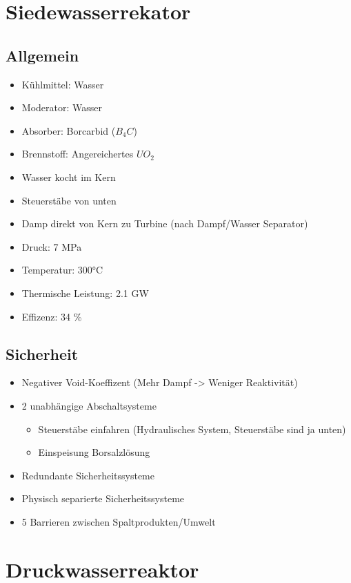 \documentclass[12pt]{article}
\begin{document}
\thispagestyle{empty}


\section{Siedewasserrekator}

\subsection{Allgemein}
\begin{itemize}
  \item Kühlmittel: Wasser
  \item Moderator: Wasser
  \item Absorber: Borcarbid (\(B_4C\))
  \item Brennstoff: Angereichertes \(UO_2\)
  \item Wasser kocht im Kern
  \item Steuerstäbe von unten
  \item Damp direkt von Kern zu Turbine (nach Dampf/Wasser Separator)
  \item Druck: 7 MPa
  \item Temperatur: 300°C
  \item Thermische Leistung: 2.1 GW
  \item Effizenz: 34 \%
\end{itemize}

\subsection{Sicherheit}
\begin{itemize}
  \item Negativer Void-Koeffizent (Mehr Dampf -> Weniger Reaktivität)
  \item 2 unabhängige Abschaltsysteme
  \begin{itemize}
    \item Steuerstäbe einfahren (Hydraulisches System, Steuerstäbe sind ja unten)
    \item Einspeisung Borsalzlösung
  \end{itemize}
  \item Redundante Sicherheitssysteme
  \item Physisch separierte Sicherheitssysteme
  \item 5 Barrieren zwischen Spaltprodukten/Umwelt
\end{itemize}

\section{Druckwasserreaktor}
\end{document}

